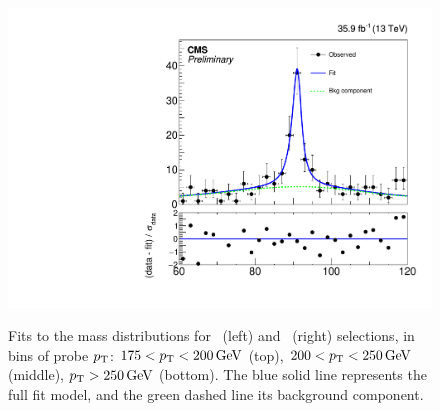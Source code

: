\begin{figure}[htbp]
{    \includegraphics[]{Analysis/Figures/fit_data_eg_pt_200_250.pdf}
  }
  \caption{
      Fits to the mass distributions for \Pe\Pe\ (left) and \Pe\Pgg\ (right) selections, in bins of probe $p_{\mathrm{T}}$: $175 < p_{\mathrm{T}} < 200\,\text{Ge\hspace{-.08em}V}$ (top), $200 < p_{\mathrm{T}} < 250\,\text{Ge\hspace{-.08em}V}$ (middle), $p_{\mathrm{T}} > 250\,\text{Ge\hspace{-.08em}V}$ (bottom). 
      The blue solid line represents the full fit model, and the green dashed line its background component.
    }
    \label{fig:efake_fits}
\end{figure}

